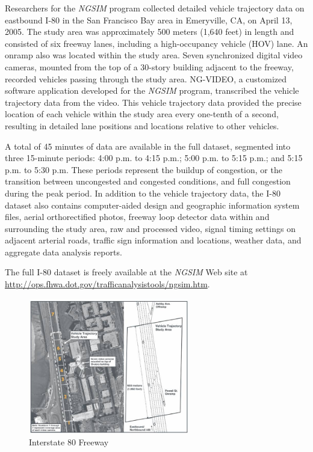 Researchers for the {\it NGSIM} program collected detailed vehicle trajectory data on eastbound I-80 in the San Francisco Bay area in Emeryville, CA, on April 13, 2005. The study area was approximately 500 meters (1,640 feet) in length and consisted of six freeway lanes, including a high-occupancy vehicle (HOV) lane. An onramp also was located within the study area. Seven synchronized digital video cameras, mounted from the top of a 30-story building adjacent to the freeway, recorded vehicles passing through the study area. NG-VIDEO, a customized software application developed for the {\it NGSIM} program, transcribed the vehicle trajectory data from the video. This vehicle trajectory data provided the precise location of each vehicle within the study area every one-tenth of a second, resulting in detailed lane positions and locations relative to other vehicles. 

A total of 45 minutes of data are available in the full dataset, segmented into three 15-minute periods: 4:00 p.m. to 4:15 p.m.; 5:00 p.m. to 5:15 p.m.; and 5:15 p.m. to 5:30 p.m. These periods represent the buildup of congestion, or the transition between uncongested and congested conditions, and full congestion during the peak period. In addition to the vehicle trajectory data, the I-80 dataset also contains computer-aided design and geographic information system files, aerial orthorectified photos, freeway loop detector data within and surrounding the study area, raw and processed video, signal timing settings on adjacent arterial roads, traffic sign information and locations, weather data, and aggregate data analysis reports.

The full I-80 dataset is freely available at the {\it NGSIM} Web site at \url{http://ops.fhwa.dot.gov/trafficanalysistools/ngsim.htm}.

\begin{figure}[H]
\begin{center}
\includegraphics[width=7cm]{./figures/image137b.jpg}
\caption{Interstate 80 Freeway}
\label{fig:pict_us80}
\end{center}
\end{figure}


